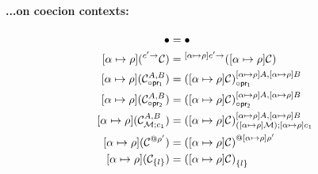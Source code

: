 \documentclass{article}
\newcommand{\mypar}[1]{\vspace{0.2cm}\paragraph{#1:} \hfill\vspace{0.1cm}}
\begin{document}
\begin{minipage}[t]{0.49\textwidth}
  \mypar{{...on coecion contexts}}
\begin{align*}
  [\substitution{\alpha}{\rho}]\bullet                       &= \bullet\\
  [\substitution{\alpha}{\rho}](\arrCC{\mathcal{C}}{c'})     &= \arrCC{([\substitution{\alpha}{\rho}]\mathcal{C})}{[\substitution{\alpha}{\rho}]c'}\\
  [\substitution{\alpha}{\rho}](\projlCC{\mathcal{C}}{A}{B}) &= \projlCC{([\substitution{\alpha}{\rho}]\mathcal{C})}{[\substitution{\alpha}{\rho}]A}{[\substitution{\alpha}{\rho}]B}\\
  [\substitution{\alpha}{\rho}](\projrCC{\mathcal{C}}{A}{B}) &= \projrCC{([\substitution{\alpha}{\rho}]\mathcal{C})}{[\substitution{\alpha}{\rho}]A}{[\substitution{\alpha}{\rho}]B}\\
  [\substitution{\alpha}{\rho}](\mpCC{\mathcal{C}}{\mathcal{M}}{c_1}{A}{B}) &= \mpCC{([\substitution{\alpha}{\rho}]\mathcal{C})}{([\substitution{\alpha}{\rho}]\mathcal{M})}{[\substitution{\alpha}{\rho}]c_1}{[\substitution{\alpha}{\rho}]A}{[\substitution{\alpha}{\rho}]B}\\
  [\substitution{\alpha}{\rho}](\alllCC{\mathcal{C}}{\rho'}) &= \alllCC{([\substitution{\alpha}{\rho}]\mathcal{C})}{[\substitution{\alpha}{\rho}]\rho'}\\
  [\substitution{\alpha}{\rho}](\recCC{\mathcal{C}}{l})     &= \recCC{([\substitution{\alpha}{\rho}]\mathcal{C})}{l}
\end{align*}
\end{minipage}
\end{document}
